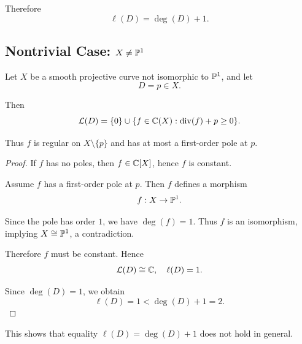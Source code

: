 Therefore
\[
    \ell(D) = \deg(D) + 1.
\]

\subsection*{Nontrivial Case: $X \neq \mathbb{P}^1$}

Let $X$ be a smooth projective curve not isomorphic to $\mathbb{P}^1$, and let
\[
    D = p \in X.
\]

Then
\[
    \mathcal{L}(D)
    = \{0\} \cup \{f \in \mathbb{C}(X) : \mathrm{div}(f) + p \geq 0\}.
\]

Thus $f$ is regular on $X \setminus \{p\}$ and has at most a first-order pole at $p$.

\begin{proof}
    If $f$ has no poles, then $f \in \mathbb{C}[X]$, hence $f$ is constant.

    Assume $f$ has a first-order pole at $p$.
    Then $f$ defines a morphism
    \[
        f : X \to \mathbb{P}^1.
    \]

    Since the pole has order $1$, we have $\deg(f) = 1$.
    Thus $f$ is an isomorphism, implying $X \cong \mathbb{P}^1$, a contradiction.

    Therefore $f$ must be constant.
    Hence
    \[
        \mathcal{L}(D) \cong \mathbb{C},
        \quad
        \ell(D) = 1.
    \]

    Since $\deg(D) = 1$, we obtain
    \[
        \ell(D) = 1 < \deg(D) + 1 = 2.
    \]
\end{proof}

This shows that equality $\ell(D) = \deg(D)+1$ does not hold in general.